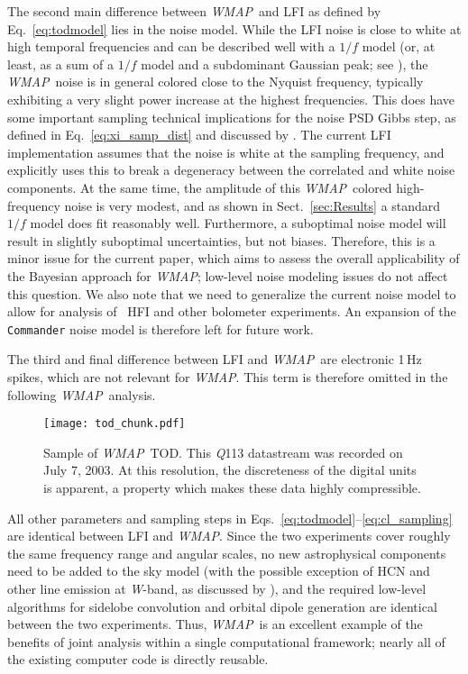\documentclass[twocolumn]{aa}
\def\WMAP{\emph{WMAP}}
\def\commander{\texttt{Commander}}
\newcommand{\Q}[0]{\textit Q}
\newcommand{\W}[0]{\textit W}
\begin{document}
The second main difference between \WMAP\ and LFI as defined by
Eq.~\eqref{eq:todmodel} lies in the noise model. While the LFI noise
is close to white at high temporal frequencies and can be described
well with a $1/f$ model (or, at least, as a sum of a $1/f$ model and a
subdominant Gaussian peak; see \citealp{bp06}), the \WMAP\ noise is
in general colored close to the Nyquist frequency, typically
exhibiting a very slight power increase at the highest
frequencies. This does have some important sampling technical
implications for the noise PSD Gibbs step, as defined in
Eq.~\eqref{eq:xi_samp_dist} and discussed by \citet{bp06}. The current
LFI implementation assumes that the noise is white at the sampling
frequency, and explicitly uses this to break a degeneracy between the
correlated and white noise components.  At the same time, the amplitude of this
\WMAP\ colored high-frequency noise is very modest, and as shown in
Sect.~\ref{sec:Results} a standard $1/f$ model does fit reasonably
well. Furthermore, a suboptimal noise model will result in
slightly suboptimal uncertainties, but not biases.  Therefore, this is
a minor issue for the current paper, which aims to assess the overall
applicability of the Bayesian approach for \WMAP; low-level noise
modeling issues do not affect this question. We also note that we need
to generalize the current noise model to allow for analysis of
\Planck\ HFI and other bolometer experiments. An expansion of the
\commander{} noise model is therefore left for future work.

The third and final difference between LFI and \WMAP\ are electronic
1\,Hz spikes, which are not relevant for \WMAP. This term is therefore
omitted in the following \WMAP\ analysis.

\begin{figure}
	\texttt{[image: tod\_chunk.pdf]}
	\caption{Sample of \WMAP\ TOD. This \Q113 datastream was recorded on July 7, 2003. At this resolution, the discreteness of the digital units is apparent, a property which makes these data highly compressible.}
	\label{fig:tod}
\end{figure}

All other parameters and sampling steps in
Eqs.~\eqref{eq:todmodel}--\eqref{eq:cl_sampling} are identical between
LFI and \WMAP. Since the two experiments cover roughly the same
frequency range and angular scales, no new astrophysical components need to be added to
the sky model (with the possible exception of HCN and other line
emission at \W-band, as discussed by \citealp{planck2014-a12}), and
the required low-level algorithms for sidelobe convolution and orbital
dipole generation are identical between the two experiments. Thus,
\WMAP\ is an excellent example of the benefits of joint analysis
within a single computational framework; nearly all of the existing
computer code is directly reusable.
\end{document}
